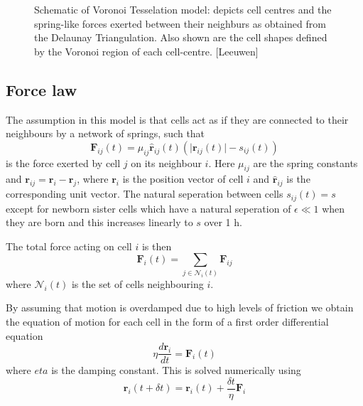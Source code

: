 \documentclass[a4paper]{article}
\begin{document}
\begin{figure}[htbp]
	\centering
	\caption{Schematic of Voronoi Tesselation model: depicts cell centres and the spring-like forces exerted between their neighburs as obtained from the Delaunay Triangulation. Also shown are the cell shapes defined by the Voronoi region of each cell-centre. [Leeuwen]}
	\label{fig:spring}
\end{figure} 
\subsection{Force law}
The assumption in this model is that cells act as if they are connected to their neighbours by a network of springs, such that 
\begin{equation} \mathbf{F}_{ij}(t) = \mu_{ij}\hat{\mathbf{r}}_{ij}(t)(\vert \mathbf{r}_{ij}(t) \vert -s_{ij}(t))
	\end{equation}
is the force exerted by cell $j$ on its neighbour $i$. Here $\mu_{ij}$ are the spring constants and $\mathbf{r}_{ij}=\mathbf{r}_{i}-\mathbf{r}_ {j}$, where $\mathbf{r}_i$ is the position vector of cell $i$ and $\hat{\mathbf{r}}_{ij}$ is the corresponding unit vector. The natural seperation between cells $s_{ij}(t)=s$ except for newborn sister cells which have a natural seperation of $\epsilon \ll 1$ when they are born and this increases linearly to $s$ over 1 h.

The total force acting on cell $i$ is then
\begin{equation}
	\mathbf{F}_i(t)= \sum_{j \in \mathcal{N}_i(t)}\mathbf{F}_{ij}
\end{equation}
where $\mathcal{N}_i(t)$ is the set of cells neighbouring $i$.

By assuming that motion is overdamped due to high levels of friction we obtain the equation of motion for each cell in the form of a first order differential equation
\begin{equation}
	\eta \frac{d\mathbf{r}_i}{dt}= \mathbf{F}_i(t)
\end{equation}
where $eta$ is the damping constant. This is solved numerically using
\begin{equation}
	\mathbf{r}_i(t+\delta t)= \mathbf{r}_i(t)+\frac{\delta t}{\eta} \mathbf{F}_i
\end{equation}
\end{document}
